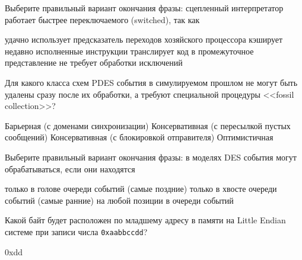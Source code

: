\documentclass[a4paper, addpoints]{exam}
\begin{document}
\begin{questions}
\question[1] Выберите правильный вариант окончания фразы: сцепленный интерпретатор работает быстрее переключаемого (switched), так как
\begin{choices}
    \correctchoice удачно использует предсказатель переходов хозяйского процессора
    \choice кэширует недавно исполненные инструкции
    \choice транслирует код в промежуточное представление
    \choice не требует обработки исключений
\end{choices}

\question[1] Для какого класса схем PDES события в симулируемом прошлом не могут быть удалены сразу после их обработки, а требуют специальной процедуры <<fossil collection>>?
\begin{choices}
    \choice Барьерная (с доменами синхронизации)
    \choice Консервативная (с пересылкой пустых сообщений)
    \choice Консервативная (с блокировкой отправителя)
    \correctchoice Оптимистичная
\end{choices}


\question[1] Выберите правильный вариант окончания фразы: в моделях DES события могут обрабатываться, если они находятся
\begin{choices}
    \choice только в голове очереди событий (самые поздние)
    \correctchoice только в хвосте очереди событий (самые ранние)
    \choice на любой позиции в очереди событий
\end{choices}

\question[1] Какой байт будет расположен по младшему адресу в памяти на Little Endian системе при записи числа \texttt{0xaabbccdd}?
\begin{solution}[1cm]
0xdd
\end{solution}




\end{questions}
\end{document}
